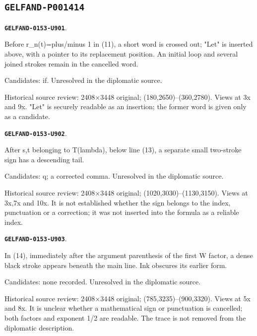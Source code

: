 \documentclass[11pt]{article}
\theoremstyle{definition}
\theoremstyle{remark}
\begin{document}
\subsection*{\texttt{GELFAND-P001414}}
\par\noindent\leavevmode{}\label{GELFAND-0153-U901}\label{GELFAND-P001414:eq11-cancelled-word:note}\textbf{\texttt{GELFAND-0153-U901}}.\nopagebreak[4]\par
Before r\_n(t)=plus/minus 1 in (11), a short word is crossed out; "Let" is inserted above, with a pointer to its replacement position. An initial loop and several joined strokes remain in the cancelled word.\par
Candidates: if. Unresolved in the diplomatic source.\par
Historical source review: 2408×3448 original; (180,2650)–(360,2780). Views at 3x and 9x. "Let" is securely readable as an insertion; the former word is given only as a candidate.\par\medskip
\par\noindent\leavevmode{}\label{GELFAND-0153-U902}\label{GELFAND-P001414:eq13-terminal-mark:note}\textbf{\texttt{GELFAND-0153-U902}}.\nopagebreak[4]\par
After s,t belonging to T(lambda), below line (13), a separate small two-stroke sign has a descending tail.\par
Candidates: q; a corrected comma. Unresolved in the diplomatic source.\par
Historical source review: 2408×3448 original; (1020,3030)–(1130,3150). Views at 3x,7x and 10x. It is not established whether the sign belongs to the index, punctuation or a correction; it was not inserted into the formula as a reliable index.\par\medskip
\par\noindent\leavevmode{}\label{GELFAND-0153-U903}\label{GELFAND-P001414:eq14-blotted-mark:note}\textbf{\texttt{GELFAND-0153-U903}}.\nopagebreak[4]\par
In (14), immediately after the argument parenthesis of the first W factor, a dense black stroke appears beneath the main line. Ink obscures its earlier form.\par
Candidates: none recorded. Unresolved in the diplomatic source.\par
Historical source review: 2408×3448 original; (785,3235)–(900,3320). Views at 5x and 8x. It is unclear whether a mathematical sign or punctuation is cancelled; both factors and exponent 1/2 are readable. The trace is not removed from the diplomatic description.\par\medskip
\end{document}
